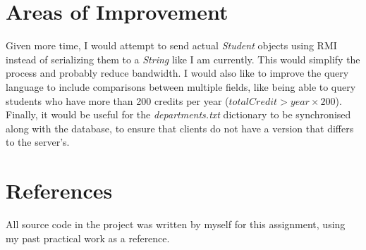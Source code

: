 \documentclass[a4paper,11pt]{article}
\begin{document}
\section{Areas of Improvement}
Given more time, I would attempt to send actual \emph{Student} objects using RMI instead of serializing them to a \emph{String} like I am currently. This would simplify the process and probably reduce bandwidth. I would also like to improve the query language to include comparisons between multiple fields, like being able to query students who have more than 200 credits per year ($totalCredit > year \times 200$). Finally, it would be useful for the \emph{departments.txt} dictionary to be synchronised along with the database, to ensure that clients do not have a version that differs to the server's.

\section{References}
All source code in the project was written by myself for this assignment, using my past practical work as a reference.
\end{document}
